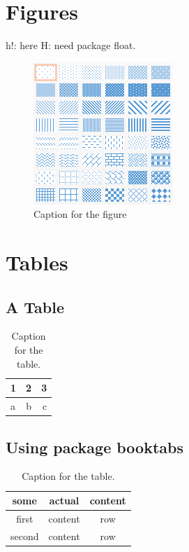 \documentclass{article}
\begin{document}
	\section{Figures}
	h!: here \newline
	H: need package float.
	\begin{figure}[H]
		\includegraphics[scale=0.3]{Res/figure.png}
		\caption{Caption for the figure}
		\label{fig:fig1}
	\end{figure}
	
	\section{Tables}
	\subsection{A Table}
	\begin{table}[H]
		\centering
  		\caption{Caption for the table.}
		\label{tab:table1}
		\begin{tabular}{l|c||r}
			1 & 2 & 3\\
			\hline
			a & b & c\\
		\end{tabular}
	\end{table}
	\subsection{Using package booktabs}
	\begin{table}[h!]
		\centering
		\caption{Caption for the table.}
		\label{tab:table2}
		\begin{tabular}{ccc}
			\toprule
			some & actual & content\\
			\midrule
			first & content & row\\
			second & content & row\\
			\bottomrule
		\end{tabular}
	\end{table}
\end{document}
